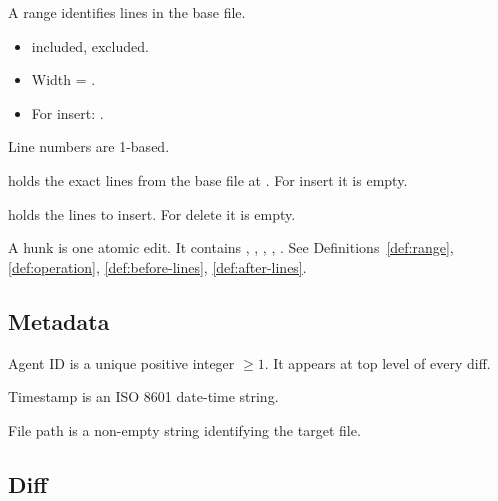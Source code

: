 \begin{definition}[Range]\label{def:range}
A range \code{[start, stop)} identifies lines in the base file.
\begin{itemize}
  \item {} included,  excluded.
  \item Width = .
  \item For insert: .
\end{itemize}
Line numbers are 1-based.
\end{definition}

\begin{definition}\label{def:before-lines}
 holds the exact lines from the base file at . For insert it is empty.
\end{definition}

\begin{definition}\label{def:after-lines}
 holds the lines to insert. For delete it is empty.
\end{definition}

\begin{definition}[Hunk]\label{def:hunk}
A hunk is one atomic edit. It contains , , , , .
See Definitions~\ref{def:range}, \ref{def:operation}, \ref{def:before-lines}, \ref{def:after-lines}.
\end{definition}

\subsection{Metadata}

\begin{definition}[Agent ID]\label{def:agent-id}
Agent ID is a unique positive integer $\geq 1$. It appears at top level of every diff.
\end{definition}

\begin{definition}[Timestamp]\label{def:timestamp}
Timestamp is an ISO 8601 date-time string.
\end{definition}

\begin{definition}\label{def:file-path}
File path is a non-empty string identifying the target file.
\end{definition}

\subsection{Diff}

